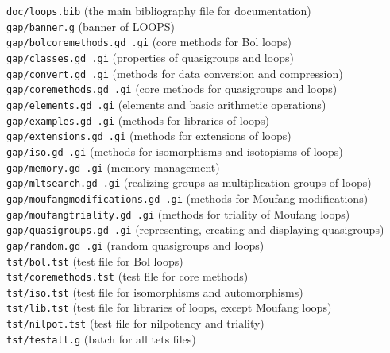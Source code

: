\documentclass[a4paper,11pt]{report}
\begin{document}
{\texttt{doc/loops.bib} (the main bibliography file for documentation) \\
\texttt{gap/banner.g} (banner of LOOPS) \\
\texttt{gap/bol{\textunderscore}core{\textunderscore}methods.gd .gi} (core methods for Bol loops) \\
\texttt{gap/classes.gd .gi} (properties of quasigroups and loops) \\
\texttt{gap/convert.gd .gi} (methods for data conversion and compression) \\
\texttt{gap/core{\textunderscore}methods.gd .gi} (core methods for quasigroups and loops) \\
\texttt{gap/elements.gd .gi} (elements and basic arithmetic operations) \\
\texttt{gap/examples.gd .gi} (methods for libraries of loops) \\
\texttt{gap/extensions.gd .gi} (methods for extensions of loops) \\
\texttt{gap/iso.gd .gi} (methods for isomorphisms and isotopisms of loops) \\
\texttt{gap/memory.gd .gi} (memory management) \\
\texttt{gap/mlt{\textunderscore}search.gd .gi} (realizing groups as multiplication groups of loops) \\
\texttt{gap/moufang{\textunderscore}modifications.gd .gi} (methods for Moufang modifications) \\
\texttt{gap/moufang{\textunderscore}triality.gd .gi} (methods for triality of Moufang loops) \\
\texttt{gap/quasigroups.gd .gi} (representing, creating and displaying quasigroups) \\
\texttt{gap/random.gd .gi} (random quasigroups and loops) \\
\texttt{tst/bol.tst} (test file for Bol loops) \\
\texttt{tst/core{\textunderscore}methods.tst} (test file for core methods) \\
\texttt{tst/iso.tst} (test file for isomorphisms and automorphisms) \\
\texttt{tst/lib.tst} (test file for libraries of loops, except Moufang loops) \\
\texttt{tst/nilpot.tst} (test file for nilpotency and triality) \\
\texttt{tst/testall.g} (batch for all tets files) }
\end{document}

